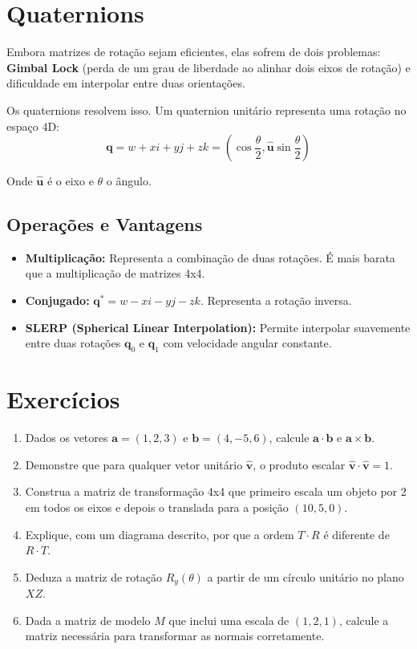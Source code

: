 \section{Quaternions}

Embora matrizes de rotação sejam eficientes, elas sofrem de dois problemas: \textbf{Gimbal Lock} (perda de um grau de liberdade ao alinhar dois eixos de rotação) e dificuldade em interpolar entre duas orientações.

Os quaternions resolvem isso. Um quaternion unitário representa uma rotação no espaço 4D:
\begin{equation}
    \mathbf{q} = w + xi + yj + zk = (\cos\frac{\theta}{2}, \hat{\mathbf{u}}\sin\frac{\theta}{2})
\end{equation}

Onde $\hat{\mathbf{u}}$ é o eixo e $\theta$ o ângulo.

\subsection{Operações e Vantagens}

\begin{itemize}
    \item \textbf{Multiplicação:} Representa a combinação de duas rotações. É mais barata que a multiplicação de matrizes 4x4.
    \item \textbf{Conjugado:} $\mathbf{q}^* = w - xi - yj - zk$. Representa a rotação inversa.
    \item \textbf{SLERP (Spherical Linear Interpolation):} Permite interpolar suavemente entre duas rotações $\mathbf{q}_0$ e $\mathbf{q}_1$ com velocidade angular constante.
\end{itemize}

\section*{Exercícios}

\begin{enumerate}
    \item Dados os vetores $\mathbf{a} = (1, 2, 3)$ e $\mathbf{b} = (4, -5, 6)$, calcule $\mathbf{a} \cdot \mathbf{b}$ e $\mathbf{a} \times \mathbf{b}$.
    \item Demonstre que para qualquer vetor unitário $\hat{\mathbf{v}}$, o produto escalar $\hat{\mathbf{v}} \cdot \hat{\mathbf{v}} = 1$.
    \item Construa a matriz de transformação 4x4 que primeiro escala um objeto por 2 em todos os eixos e depois o translada para a posição $(10, 5, 0)$.
    \item Explique, com um diagrama descrito, por que a ordem $T \cdot R$ é diferente de $R \cdot T$.
    \item Deduza a matriz de rotação $R_y(\theta)$ a partir de um círculo unitário no plano $XZ$.
    \item Dada a matriz de modelo $M$ que inclui uma escala de $(1, 2, 1)$, calcule a matriz necessária para transformar as normais corretamente.
\end{enumerate}
